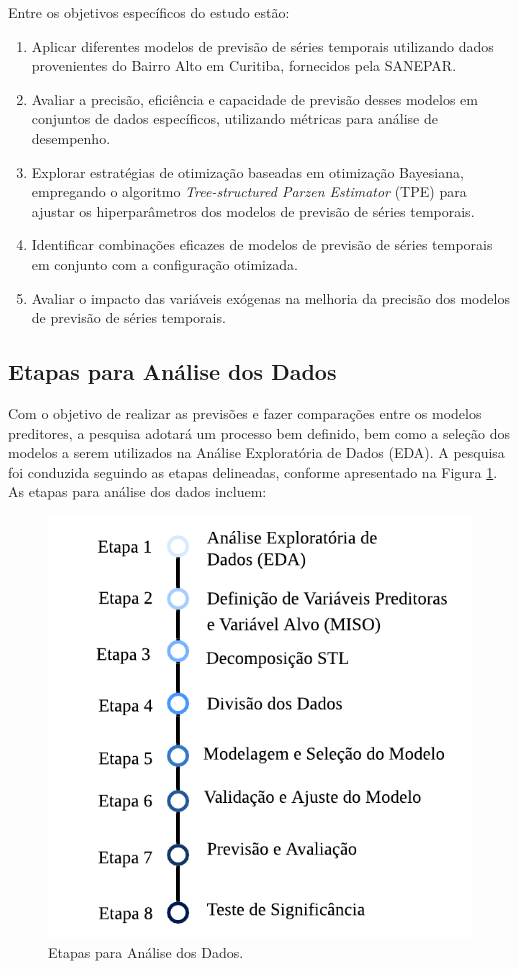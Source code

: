 Entre os objetivos específicos do estudo estão:
\begin{enumerate}
	
	\item Aplicar diferentes modelos de previsão de séries temporais utilizando dados provenientes do Bairro Alto em Curitiba, fornecidos pela SANEPAR.
	
	\item Avaliar a precisão, eficiência e capacidade de previsão desses modelos em conjuntos de dados específicos, utilizando métricas para análise de desempenho.
	
	\item Explorar estratégias de otimização baseadas em otimização Bayesiana, empregando o algoritmo \textit{Tree-structured Parzen Estimator} (TPE) para ajustar os hiperparâmetros dos modelos de previsão de séries temporais.
	
	\item Identificar combinações eficazes de modelos de previsão de séries temporais em conjunto com a configuração otimizada. 
	
	\item Avaliar o impacto das variáveis exógenas na melhoria da precisão dos modelos de previsão de séries temporais.
	
\end{enumerate}

\subsection{Etapas para An\'alise dos Dados} 
\label{subsec:metod}

Com o objetivo de realizar as previsões e fazer comparações entre os modelos preditores, a pesquisa adotará um processo bem definido, bem como a seleção dos modelos a serem utilizados na Análise Exploratória de Dados (EDA). A pesquisa foi conduzida seguindo as etapas delineadas, conforme apresentado na Figura \ref{fig:etapas}.
As etapas para análise dos dados incluem:

\begin{figure}[!htb]
	\centering
	\caption{Etapas para Análise dos Dados.}
	\label{fig:etapas}
	\includegraphics[width=0.7\linewidth]{Introducao/Figuras/Etapas.pdf}
\end{figure}

